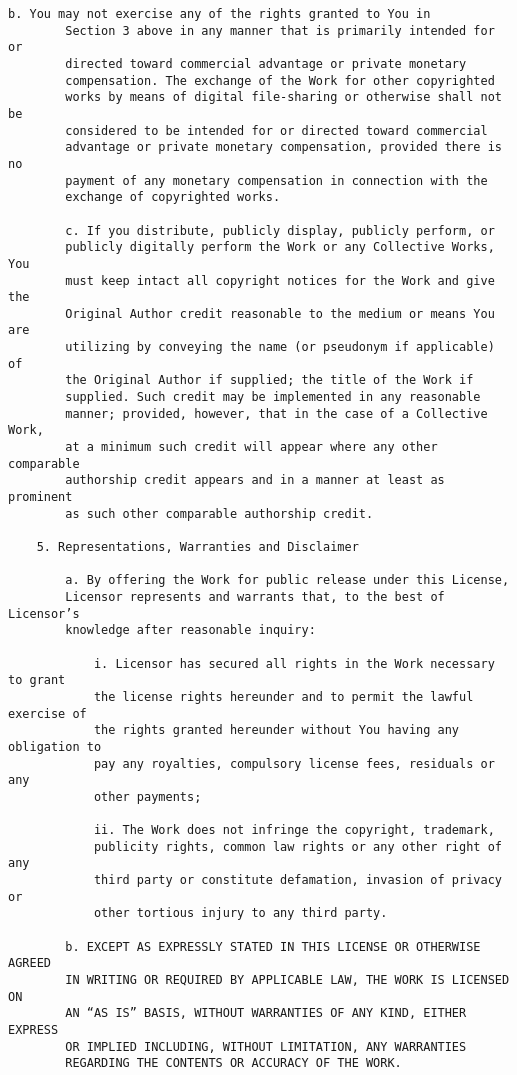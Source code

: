 \begin{Verbatim}[fontsize=\footnotesize]
        b. You may not exercise any of the rights granted to You in
        Section 3 above in any manner that is primarily intended for or
        directed toward commercial advantage or private monetary
        compensation. The exchange of the Work for other copyrighted
        works by means of digital file-sharing or otherwise shall not be
        considered to be intended for or directed toward commercial
        advantage or private monetary compensation, provided there is no
        payment of any monetary compensation in connection with the
        exchange of copyrighted works.
        
        c. If you distribute, publicly display, publicly perform, or
        publicly digitally perform the Work or any Collective Works, You
        must keep intact all copyright notices for the Work and give the
        Original Author credit reasonable to the medium or means You are
        utilizing by conveying the name (or pseudonym if applicable) of
        the Original Author if supplied; the title of the Work if
        supplied. Such credit may be implemented in any reasonable
        manner; provided, however, that in the case of a Collective Work,
        at a minimum such credit will appear where any other comparable
        authorship credit appears and in a manner at least as prominent
        as such other comparable authorship credit.
    
    5. Representations, Warranties and Disclaimer
    
        a. By offering the Work for public release under this License,
        Licensor represents and warrants that, to the best of Licensor’s
        knowledge after reasonable inquiry:
            
            i. Licensor has secured all rights in the Work necessary to grant
            the license rights hereunder and to permit the lawful exercise of
            the rights granted hereunder without You having any obligation to
            pay any royalties, compulsory license fees, residuals or any
            other payments;
            
            ii. The Work does not infringe the copyright, trademark,
            publicity rights, common law rights or any other right of any
            third party or constitute defamation, invasion of privacy or
            other tortious injury to any third party.
        
        b. EXCEPT AS EXPRESSLY STATED IN THIS LICENSE OR OTHERWISE AGREED
        IN WRITING OR REQUIRED BY APPLICABLE LAW, THE WORK IS LICENSED ON
        AN “AS IS” BASIS, WITHOUT WARRANTIES OF ANY KIND, EITHER EXPRESS
        OR IMPLIED INCLUDING, WITHOUT LIMITATION, ANY WARRANTIES
        REGARDING THE CONTENTS OR ACCURACY OF THE WORK.
    

\end{Verbatim}

